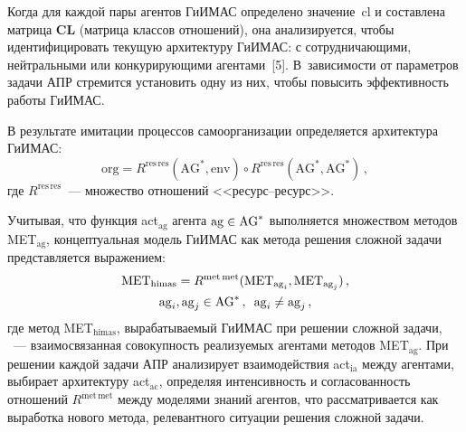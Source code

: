 \begin{multicols}{2}
  Когда для каждой пары агентов ГиИМАС определено значение~cl и 
составлена матрица \textbf{CL} (матрица классов отношений), она 
анализируется, чтобы идентифицировать текущую архитектуру ГиИМАС: с 
сотрудничающими, нейтральными или конкурирующими агентами~[5]. 
В~зависимости от па\-ра\-мет\-ров задачи АПР стремится установить одну из них, 
чтобы повысить эффективность работы ГиИМАС. 
  
  В результате имитации процессов самоорганизации определяется 
архитектура ГиИМАС: 
  \begin{equation}
\mathrm{org}=R^{\mathrm{res\,res}} (\mathrm{AG}^*,\mathrm{env}) \circ 
R^{\mathrm{res\,res}} (\mathrm{AG}^*, \mathrm{AG}^*)\,,
  \label{e8-lis}
  \end{equation}
где $R^{\mathrm{res\,res}}$~--- множество отношений <<ре\-сурс--ре\-сурс>>. 
  
  Учитывая, что функция act$_{\mathrm{ag}}$ агента $\mathrm{ag}\hm\in \mathrm{AG}^*$ выполняется 
множеством методов MET$_{\mathrm{ag}}$, концептуальная модель ГиИМАС как 
метода решения сложной задачи представляется выражением:
\begin{multline*}
  \mathrm{MET}_{\mathrm{himas}} =R^{\mathrm{met\,met}} (\mathrm{MET}_{\mathrm{ag}_i},
   \mathrm{MET}_{\mathrm{ag}_j})\,,\\ 
  \mathrm{ag}_i, \mathrm{ag}_j \in \mathrm{AG}^*\,,\enskip \mathrm{ag}_i\not=\mathrm{ag}_j\,,
  \end{multline*}
где метод MET$_{\mathrm{himas}}$, вырабатываемый ГиИМАС при решении сложной 
задачи, ~--- взаимосвязанная совокупность реализуемых агентами методов 
MET$_{\mathrm{ag}}$. При решении каждой задачи АПР анализирует взаимодействия 
act$_{\mathrm{ia}}$ между агентами, выбирает архитектуру act$_{\mathrm{ac}}$, определяя 
интенсивность и согласованность отношений $R^{\mathrm{met\,met}}$ между моделями 
знаний агентов, что рассматривается как выработка нового метода, 
релевантного ситуации решения сложной задачи. 

\begin{figure*}[b] %
  \vspace*{12pt}
 \begin{center}
 \mbox{%
 \epsfxsize=152.951mm
 }
 \end{center}
 \vspace*{-6pt}
\end{figure*}
  

\end{multicols}
